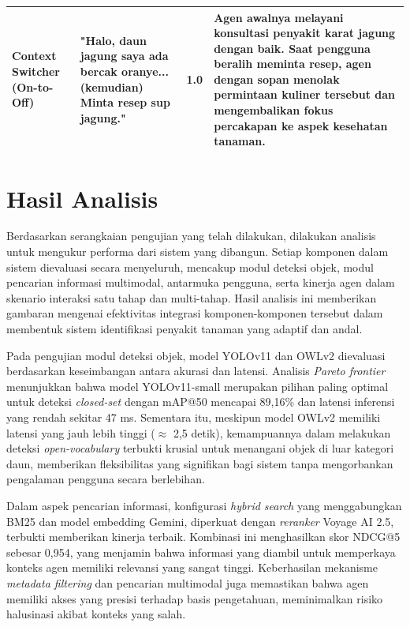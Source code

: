 \begin{table}[H]
{\begin{tabular}{|p{3cm}|p{4cm}|c|p{7cm}|}
    \textbf{Context Switcher} \newline (On-to-Off) & "Halo, daun jagung saya ada bercak oranye... (kemudian) Minta resep sup jagung." & 1.0 & Agen awalnya melayani konsultasi penyakit karat jagung dengan baik. Saat pengguna beralih meminta resep, agen dengan sopan menolak permintaan kuliner tersebut dan mengembalikan fokus percakapan ke aspek kesehatan tanaman. \\ \hline
    \end{tabular}%
    }
\end{table}

\section{Hasil Analisis}
Berdasarkan serangkaian pengujian yang telah dilakukan, dilakukan analisis untuk mengukur performa dari sistem yang dibangun. Setiap komponen dalam sistem dievaluasi secara menyeluruh, mencakup modul deteksi objek, modul pencarian informasi multimodal, antarmuka pengguna, serta kinerja agen dalam skenario interaksi satu tahap dan multi-tahap. Hasil analisis ini memberikan gambaran mengenai efektivitas integrasi komponen-komponen tersebut dalam membentuk sistem identifikasi penyakit tanaman yang adaptif dan andal.

Pada pengujian modul deteksi objek, model YOLOv11 dan OWLv2 dievaluasi berdasarkan keseimbangan antara akurasi dan latensi. Analisis \textit{Pareto frontier} menunjukkan bahwa model YOLOv11-small merupakan pilihan paling optimal untuk deteksi \textit{closed-set} dengan mAP@50 mencapai 89,16\% dan latensi inferensi yang rendah sekitar 47 ms. Sementara itu, meskipun model OWLv2 memiliki latensi yang jauh lebih tinggi ($\approx$ 2,5 detik), kemampuannya dalam melakukan deteksi \textit{open-vocabulary} terbukti krusial untuk menangani objek di luar kategori daun, memberikan fleksibilitas yang signifikan bagi sistem tanpa mengorbankan pengalaman pengguna secara berlebihan.

Dalam aspek pencarian informasi, konfigurasi \textit{hybrid search} yang menggabungkan BM25 dan model embedding Gemini, diperkuat dengan \textit{reranker} Voyage AI 2.5, terbukti memberikan kinerja terbaik. Kombinasi ini menghasilkan skor NDCG@5 sebesar 0,954, yang menjamin bahwa informasi yang diambil untuk memperkaya konteks agen memiliki relevansi yang sangat tinggi. Keberhasilan mekanisme \textit{metadata filtering} dan pencarian multimodal juga memastikan bahwa agen memiliki akses yang presisi terhadap basis pengetahuan, meminimalkan risiko halusinasi akibat konteks yang salah.

